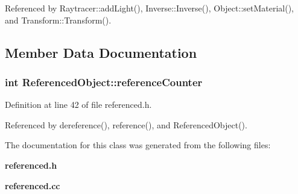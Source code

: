 Referenced by Raytracer\+::add\+Light(), Inverse\+::\+Inverse(), Object\+::set\+Material(), and Transform\+::\+Transform().



\subsection{Member Data Documentation}
\subsubsection[{reference\+Counter}]{\setlength{\rightskip}{0pt plus 5cm}int Referenced\+Object\+::reference\+Counter\hspace{0.3cm}{\ttfamily [private]}}\label{class_referenced_object_ae69c5359c130b544300b7ce189fd1d39}


Definition at line 42 of file referenced.\+h.



Referenced by dereference(), reference(), and Referenced\+Object().



The documentation for this class was generated from the following files\+:\begin{DoxyCompactItemize}
\item 
{\bf referenced.\+h}\item 
{\bf referenced.\+cc}\end{DoxyCompactItemize}
